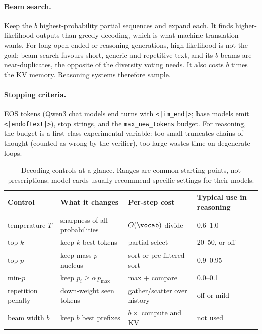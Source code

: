 \paragraph{Beam search.} Keep the $b$ highest-probability partial sequences and expand each. It finds
higher-likelihood outputs than greedy decoding, which is what machine translation wants. For long
open-ended or reasoning generations, high likelihood is not the goal: beam search favours short,
generic and repetitive text, and its $b$ beams are near-duplicates, the opposite of the diversity
voting needs. It also costs $b$ times the KV memory. Reasoning systems therefore sample.

\paragraph{Stopping criteria.} EOS tokens (Qwen3 chat models end turns with
\texttt{<|im\_end|>}; base models emit \texttt{<|endoftext|>}), stop strings, and the
\texttt{max\_new\_tokens} budget. For reasoning, the budget is a first-class experimental variable:
too small truncates chains of thought (counted as wrong by the verifier), too large wastes time on
degenerate loops.

\begin{table}[t]
\centering\small
\begin{tabular}{@{}llll@{}}
\toprule
Control & What it changes & Per-step cost & Typical use in reasoning \\
\midrule
temperature $T$ & sharpness of all probabilities & $O(\vocab)$ divide & 0.6--1.0 \\
top-$k$ & keep $k$ best tokens & partial select & 20--50, or off \\
top-$p$ & keep mass-$p$ nucleus & sort or pre-filtered sort & 0.9--0.95 \\
min-$p$ & keep $p_i \ge \alpha\, p_{\max}$ & max + compare & 0.0--0.1 \\
repetition penalty & down-weight seen tokens & gather/scatter over history & off or mild \\
beam width $b$ & keep $b$ best prefixes & $b\times$ compute and KV & not used \\
\bottomrule
\end{tabular}
\caption{Decoding controls at a glance. Ranges are common starting points, not prescriptions; model
cards usually recommend specific settings for their models.}
\label{tab:scaling:controls}
\end{table}

